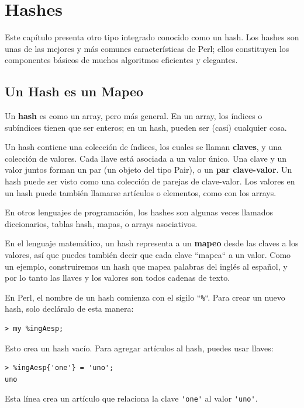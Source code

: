 
\chapter{Hashes}
\label{hashes}

Este capítulo presenta otro tipo integrado conocido como un
hash. Los hashes son unas de las mejores y más comunes 
características de Perl; ellos constituyen los componentes básicos
de muchos algoritmos eficientes y elegantes.

\section{Un Hash es un Mapeo}
\label{hash_descr}

Un {\bf hash} es como un array, pero más general. En un array,
los índices o subíndices tienen que ser enteros; en un hash,
pueden ser (casi) cualquier cosa.

Un hash contiene una colección de índices, los cuales se llaman
{\bf claves}, y una colección de valores. 
Cada llave está asociada a un valor único. Una clave y un valor
juntos forman un par (un objeto del tipo Pair), o un {\bf par
clave-valor}. Un hash puede ser visto como una colección de parejas de
clave-valor. Los valores en un hash puede también llamarse artículos o 
elementos, como con los arrays.

En otros lenguajes de programación, los hashes son algunas veces
llamados diccionarios, tablas hash, mapas, o arrays asociativos.

En el lenguaje matemático, un hash representa a un {\bf mapeo}
desde las claves a los valores, así que puedes también decir que cada
clave ``mapea`` a un valor. Como un ejemplo, construiremos un hash
que mapea palabras del inglés al español, y por lo tanto las llaves y
los valores son todos cadenas de texto.

En Perl, el nombre de un hash comienza con el sigilo ``\verb|%|``. Para
crear un nuevo hash, solo decláralo de esta manera:

\begin{verbatim}
> my %ingAesp;
\end{verbatim}

Esto crea un hash vacío. Para agregar artículos al hash,
puedes usar llaves:

\begin{verbatim}
> %ingAesp{'one'} = 'uno';
uno
\end{verbatim}
%
Esta línea crea un artículo que relaciona la clave
\verb"'one'" al valor \verb"'uno'".  

